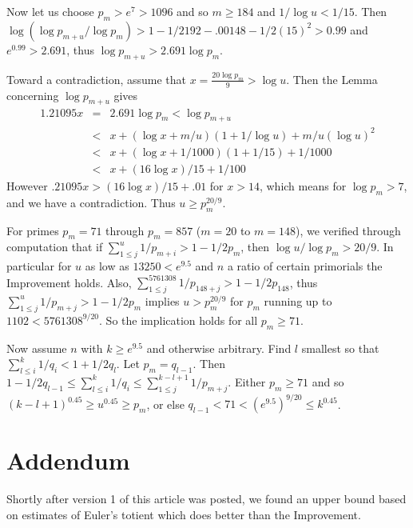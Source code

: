 \documentclass[12pt,leqno]{article}
\begin{document}
Now let us choose $p_m \gt e^7 \gt 1096$ and so $m \geq 184$ and $1/\log u \lt 1/15$.
Then $\log(\log p_{m+u}/\log p_m) \gt 1 - 1/2192 - .00148 - 1/2(15)^2 \gt 0.99$
and $e^{0.99} \gt 2.691$, thus $\log p_{m+u} \gt 2.691 \log p_m$.

Toward a contradiction, assume that $x = \frac{20 \log p_m}{9} \gt \log u$.
Then the Lemma concerning $\log{p_{m+u}}$ gives
\begin{eqnarray*}
1.21095 x & = & 2.691 \log p_m \lt \log p_{m+u} \\
& \lt & x + (\log x + m/u)(1 + 1/\log u) + m/u(\log u)^2 \\
  & \lt & x + (\log x + 1/1000)(1 + 1/15) + 1/1000 \\
  & \lt & x + (16\log x)/15 + 1/100
\end{eqnarray*}
However $.21095 x \gt (16\log x)/15 + .01$ for $x \gt 14$, which means for $\log p_m \gt 7$,
and we have a contradiction.  Thus $u \geq p_m^{20/9}$.

For primes $p_m=71$ through $p_m=857$ ($m=20$ to $m=148$), we verified through 
computation that if
$\sum_{1 \leq j}^u 1/p_{m+i} \gt 1 - 1/2p_m$, then
$\log u /\log p_m \gt 20/9$. In particular for $u$ as low as $13250 \lt e^{9.5}$ and
$n$ a ratio of certain primorials the Improvement holds.  
Also, 
$\sum_{1 \leq j}^{5761308} 1/p_{148+j} \gt 1 - 1/2p_{148}$, thus
$\sum_{1 \leq j}^u 1/p_{m+j} \gt 1 - 1/2p_m$ implies $u \gt p_m^{20/9}$ for $p_m$
running up to $1102 \lt 5761308^{9/20}$.  So the implication holds for all $p_m \geq 71$.  

Now assume $n$ with $k \geq e^{9.5}$ and otherwise arbitrary. Find $l$
 smallest so that $\sum_{l \leq i}^k 1/q_i \lt 1 + 1/2q_l$. Let $p_m=q_{l-1}$. Then 
$1 - 1/2q_{l-1} \leq \sum_{l \leq i}^k 1/q_i \leq 
\sum_{1 \leq j}^{k-l+1} 1/p_{m+j}.$
Either $p_m \geq 71$ and so $(k-l+1)^{0.45}\geq u^{0.45} \geq p_m$, or else 
$q_{l-1} \lt 71 \lt (e^{9.5})^{9/20} \leq k^{0.45}$.

\section{Addendum}

Shortly after version 1 of this article was posted, we found an
upper bound based on estimates of Euler's totient which does 
better than the Improvement.
\end{document}

